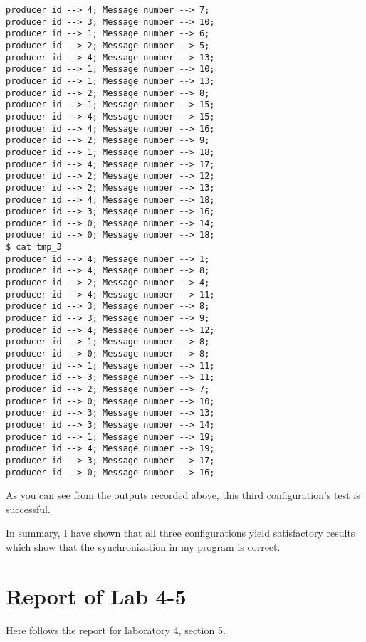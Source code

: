 \documentclass[11pt]{article}
\begin{document}
\begin{question}
\begin{subquestion}
\begin{verbatim}
producer id --> 4; Message number --> 7;
producer id --> 3; Message number --> 10;
producer id --> 1; Message number --> 6;
producer id --> 2; Message number --> 5;
producer id --> 4; Message number --> 13;
producer id --> 1; Message number --> 10;
producer id --> 1; Message number --> 13;
producer id --> 2; Message number --> 8;
producer id --> 1; Message number --> 15;
producer id --> 4; Message number --> 15;
producer id --> 4; Message number --> 16;
producer id --> 2; Message number --> 9;
producer id --> 1; Message number --> 18;
producer id --> 4; Message number --> 17;
producer id --> 2; Message number --> 12;
producer id --> 2; Message number --> 13;
producer id --> 4; Message number --> 18;
producer id --> 3; Message number --> 16;
producer id --> 0; Message number --> 14;
producer id --> 0; Message number --> 18;
$ cat tmp_3
producer id --> 4; Message number --> 1;
producer id --> 4; Message number --> 8;
producer id --> 2; Message number --> 4;
producer id --> 4; Message number --> 11;
producer id --> 3; Message number --> 8;
producer id --> 3; Message number --> 9;
producer id --> 4; Message number --> 12;
producer id --> 1; Message number --> 8;
producer id --> 0; Message number --> 8;
producer id --> 1; Message number --> 11;
producer id --> 3; Message number --> 11;
producer id --> 2; Message number --> 7;
producer id --> 0; Message number --> 10;
producer id --> 3; Message number --> 13;
producer id --> 3; Message number --> 14;
producer id --> 1; Message number --> 19;
producer id --> 4; Message number --> 19;
producer id --> 3; Message number --> 17;
producer id --> 0; Message number --> 16;
        \end{verbatim}

        As you can see from the outputs recorded above, this third configuration's test is successful.
    \end{subquestion}

    In summary, I have shown that all three configurations yield satisfactory results which show that the synchronization in my program is correct.

\end{question}

\section{Report of Lab 4-5}

    Here follows the report for laboratory 4, section 5.
\end{document}
